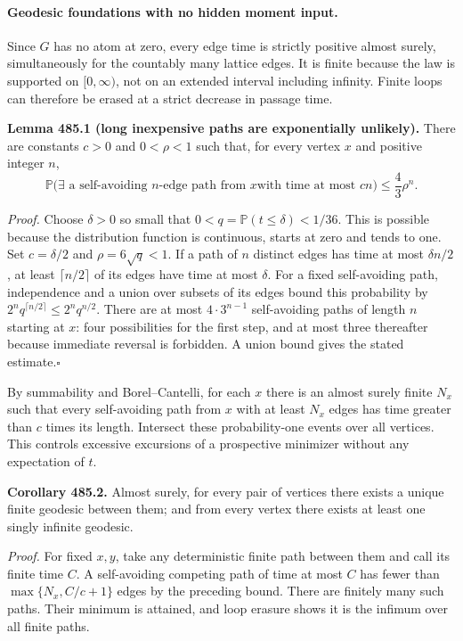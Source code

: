 \documentclass[11pt]{article}
\begin{document}
\paragraph{Geodesic foundations with no hidden moment input.}
Since $G$ has no atom at zero, every edge time is strictly positive almost
surely, simultaneously for the countably many lattice edges. It is finite
because the law is supported on $[0,\infty)$, not on an extended interval
including infinity. Finite loops can therefore be erased at a strict
decrease in passage time.

\textbf{Lemma 485.1 (long inexpensive paths are exponentially unlikely).}
There are constants $c>0$ and $0<\rho<1$ such that, for every vertex $x$
and positive integer $n$,
\[
 \mathbb P\bigl(\exists\text{ a self-avoiding $n$-edge path from $x$
                       with time at most }cn\bigr)
 \leq\frac43\rho^n.
\]

\emph{Proof.}
Choose $\delta>0$ so small that
$0<q=\mathbb P(t\leq\delta)<1/36$. This is possible because the
distribution function is continuous, starts at zero and tends to one.
Set $c=\delta/2$ and $\rho=6\sqrt q<1$.
If a path of $n$ distinct edges has time at most $\delta n/2$, at least
$\lceil n/2\rceil$ of its edges have time at most $\delta$.
For a fixed self-avoiding path, independence and a union over subsets of
its edges bound this probability by
$2^n q^{\lceil n/2\rceil}\leq2^n q^{n/2}$.
There are at most $4\cdot3^{n-1}$ self-avoiding paths of length $n$
starting at $x$: four possibilities for the first step, and at most
three thereafter because immediate reversal is forbidden. A union bound
gives the stated estimate.\hfill$\square$

By summability and Borel--Cantelli, for each $x$ there is an almost surely
finite $N_x$ such that every self-avoiding path from $x$ with at least
$N_x$ edges has time greater than $c$ times its length. Intersect these
probability-one events over all vertices. This controls excessive
excursions of a prospective minimizer without any expectation of $t$.

\textbf{Corollary 485.2.} Almost surely, for every pair of vertices there
exists a unique finite geodesic between them; and from every vertex there
exists at least one singly infinite geodesic.

\emph{Proof.}
For fixed $x,y$, take any deterministic finite path between them and call
its finite time $C$. A self-avoiding competing path of time at most $C$
has fewer than $\max\{N_x,C/c+1\}$ edges by the preceding bound.
There are finitely many such paths. Their minimum is attained, and loop
erasure shows it is the infimum over all finite paths.
\end{document}
